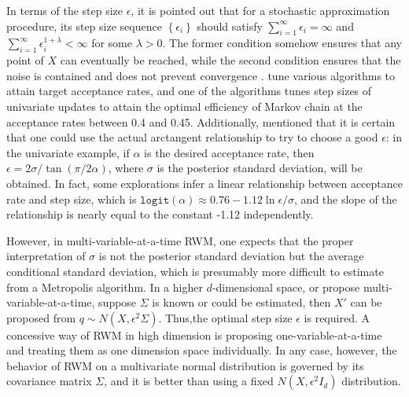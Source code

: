 In terms of the step size $\epsilon$, it is pointed out that for a stochastic approximation procedure, its step size sequence $\left\lbrace \epsilon_i\right\rbrace$ should satisfy $\sum_{i=1}^\infty \epsilon_i=\infty $ and $\sum_{i=1}^\infty \epsilon_i^{1+\lambda}<\infty $ for some $\lambda>0$. The former condition somehow ensures that any point of $X$ can eventually be reached, while the second condition ensures that the noise is contained and does not prevent convergence \citep{andrieu2008tutorial}. \cite{sherlock2010random} tune various algorithms to attain target acceptance rates, and one of the algorithms tunes step sizes of univariate updates to attain the optimal efficiency of Markov chain at the acceptance rates between 0.4 and 0.45. Additionally, \cite{graves2011automatic} mentioned that it is certain that one could use the actual arctangent relationship to try to choose a good $\epsilon$: in the univariate example, if $\alpha$ is the desired acceptance rate, then $\epsilon = 2\sigma / \tan \left(\pi/2\alpha\right)$, where $\sigma$ is the posterior standard deviation, will be obtained. In fact, some explorations infer a linear relationship between acceptance rate and step size, which is $\mathtt{logit}(\alpha) \approx 0.76-1.12\ln \epsilon/\sigma$, and the slope of the relationship is nearly equal to the constant -1.12 independently. 

However, in multi-variable-at-a-time RWM, one expects that the proper interpretation of $\sigma$ is not the posterior standard deviation but the average conditional standard deviation, which is presumably more difficult to estimate from a Metropolis algorithm. In a higher $d$-dimensional space, or propose multi-variable-at-a-time, suppose $\Sigma$ is known or could be estimated, then $X'$ can be proposed from $q\sim N\left(X,\epsilon^2\Sigma\right)$. Thus,the optimal step size $\epsilon$ is required. A concessive way of RWM in high dimension is proposing one-variable-at-a-time and treating them as one dimension space individually. In any case, however, the behavior of RWM on a multivariate normal distribution is governed by its covariance matrix $\Sigma$, and it is better than using a fixed $N\left(X,\epsilon^2I_d\right)$ distribution\citep{roberts2001optimal}.


